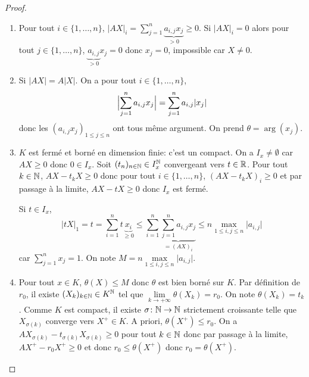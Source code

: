 \begin{proof}
	\phantom{}
	\begin{enumerate}
		\item Pour tout $i\in\{1,\dots,n\}$, $\vert AX\vert_{i}=\sum_{j=1}^{n}\underbrace{a_{i,j}x_{j}}_{>0}\geqslant0$. Si $\vert AX\vert_{i}=0$ alors pour tout $j\in\{1,\dots,n\}$, $\underbrace{a_{i,j}}_{>0}x_{j}=0$ donc $x_{j}=0$, impossible car $X\neq 0$.
		
		\item Si $\vert AX\vert=A\vert X\vert$. On a pour tout $i\in\{1,\dots,n\}$,
		\begin{equation}\Bigl\lvert\sum_{j=1}^{n}a_{i,j}x_{j}\Bigr\rvert=\sum_{j=1}^{n}a_{i,j}\lvert x_{j}\rvert\end{equation}
		donc les $(a_{i,j}x_{j})_{1\leqslant j\leqslant n}$ ont tous même argument. On prend $\theta=\arg(x_{j})$.

		\item $K$ est fermé et borné en dimension finie: c'est un compact. On a $I_{x}\neq\emptyset$ car $AX\geqslant0$ donc $0\in I_{x}$. Soit $(t_{n})_{n\in\mathbb{N}}\in I_{x}^{\mathbb{N}}$ convergeant vers $t\in\mathbb{R}$. Pour tout $k\in\mathbb{N}$, $AX-t_{k}X\geqslant0$ donc pour tout $i\in\{1,\dots,n\}$, $(AX-t_{k}X)_{i}\geqslant0$ et par passage à la limite, $AX-tX\geqslant0$ donc $I_{x}$ est fermé.
		
		Si $t\in I_{x}$, 
		\begin{equation}\vert tX\vert_{1}=t=\sum_{i=1}^{n}t\underbrace{x_{i}}_{\geqslant0}\leqslant\sum_{i=1}^{n}\underbrace{\sum_{j=1}^{n}a_{i,j}x_{j}}_{=(AX)_{i}}\leqslant n\max\limits_{1\leqslant i,j\leqslant n}\vert a_{i,j}\vert\end{equation}
		car $\sum_{j=1}^{n}x_{j}=1$.
		On note $M=n\max\limits_{1\leqslant i,j\leqslant n}\vert a_{i,j}\vert$.

		\item Pour tout $x\in K$, $\theta(X)\leqslant M$ donc $\theta$ est bien borné sur $K$. Par définition de $r_{0}$, il existe $(X_{k})_{k\in\mathbb{N}}\in K^{\mathbb{N}}$ tel que $\lim\limits_{k\to+\infty}\theta(X_k)=r_{0}$. On note $\theta(X_{k})=t_{k}$. Comme $K$ est compact, il existe $\sigma\colon\mathbb{N}\to\mathbb{N}$ strictement croissante telle que $X_{\sigma(k)}$ converge vers $X^{+}\in K$. A priori, $\theta(X^{+})\leqslant r_{0}$. On a $AX_{\sigma(k)}-t_{\sigma(k)}X_{\sigma(k)}\geqslant0$ pour tout $k\in\mathbb{N}$ donc par passage à la limite, $AX^{+}-r_{0}X^{+}\geqslant0$ et donc $r_{0}\leqslant\theta(X^{+})$ donc $r_{0}=\theta(X^{+})$.
		

\end{enumerate}
\end{proof}
